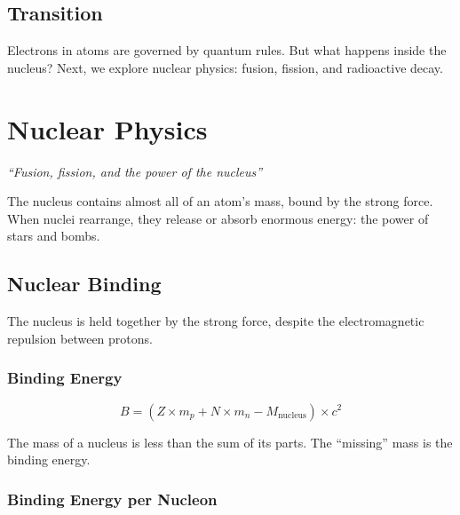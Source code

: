 \documentclass[
  11pt,
  letterpaper,
  twoside,
  openright]{book}
\begin{document}
\section{Transition}\label{transition-2}

Electrons in atoms are governed by quantum rules. But what happens
inside the nucleus? Next, we explore nuclear physics: fusion, fission,
and radioactive decay.

\chapter{Nuclear Physics}\label{sec-nuclear-physics}

\emph{``Fusion, fission, and the power of the nucleus''}

\begin{tcolorbox}[enhanced jigsaw, coltitle=black, colbacktitle=quarto-callout-note-color!10!white, toprule=.15mm, colframe=quarto-callout-note-color-frame, arc=.35mm, opacityback=0, bottomtitle=1mm, toptitle=1mm, breakable, colback=white, titlerule=0mm, opacitybacktitle=0.6, title=\textcolor{quarto-callout-note-color}{\faInfo}\hspace{0.5em}{Key Revelation}, rightrule=.15mm, bottomrule=.15mm, leftrule=.75mm, left=2mm]

The nucleus contains almost all of an atom's mass, bound by the strong
force. When nuclei rearrange, they release or absorb enormous energy:
the power of stars and bombs.

\end{tcolorbox}

\section{Nuclear Binding}\label{nuclear-binding}

The nucleus is held together by the strong force, despite the
electromagnetic repulsion between protons.

\subsection{Binding Energy}\label{binding-energy-1}

\[
B = (Z \times m_p + N \times m_n - M_{\text{nucleus}}) \times c^2
\]

The mass of a nucleus is less than the sum of its parts. The ``missing''
mass is the binding energy.

\subsection{Binding Energy per
Nucleon}\label{binding-energy-per-nucleon}
\end{document}
